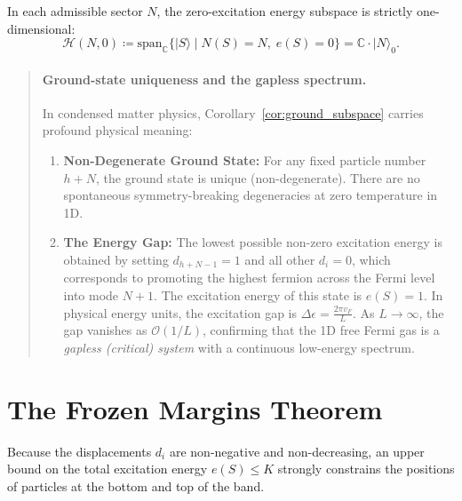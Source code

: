 \begin{corollary}
\label{cor:ground_subspace}
In each admissible sector $N$, the zero-excitation energy subspace is strictly one-dimensional:
\begin{equation}
\mathcal{H}(N, 0) \coloneqq \mathrm{span}_{\mathbb{C}} \{ |S\rangle \mid N(S) = N, \; e(S) = 0 \} = \mathbb{C} \cdot |N\rangle_0.
\end{equation}
\end{corollary}

\begin{quote}
\item[]\paragraph{Ground-state uniqueness and the gapless spectrum.}
In condensed matter physics, Corollary~\ref{cor:ground_subspace} carries profound physical meaning:
\begin{enumerate}
    \item \textbf{Non-Degenerate Ground State:} For any fixed particle number $h + N$, the ground state is unique (non-degenerate). There are no spontaneous symmetry-breaking degeneracies at zero temperature in 1D.
    \item \textbf{The Energy Gap:} The lowest possible non-zero excitation energy is obtained by setting $d_{h+N-1} = 1$ and all other $d_i = 0$, which corresponds to promoting the highest fermion across the Fermi level into mode $N+1$. The excitation energy of this state is $e(S) = 1$. In physical energy units, the excitation gap is $\Delta \epsilon = \frac{2\pi v_F}{L}$. As $L \to \infty$, the gap vanishes as $\mathcal{O}(1/L)$, confirming that the 1D free Fermi gas is a \emph{gapless (critical) system} with a continuous low-energy spectrum.
\end{enumerate}
\end{quote}

\section{The Frozen Margins Theorem}

Because the displacements $d_i$ are non-negative and non-decreasing, an upper bound on the total excitation energy $e(S) \le K$ strongly constrains the positions of particles at the bottom and top of the band.

